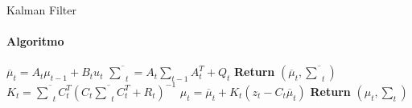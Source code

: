 \documentclass[aspectratio=169]{beamer}
\begin{document}
\begin{frame}[c]{Kalman Filter}
    
    \framesubtitle{Algoritmo}
    \begin{algorithm}[H]
        \caption{Kalman-Filter}
        \begin{algorithmic}[1]
            \State $\overline{\mu}_t = A_t\mu_{t-1} + B_t u_t$
            \State $ \overline{\textstyle\sum}_t = A_t {\textstyle\sum}_{t-1} A_t^T+ Q_t$ 
            \State \textbf{Return} $\left(\overline{\mu}_t, \overline{\textstyle\sum}_t\right)$
        \EndProcedure
            \State $K_t = \overline{\textstyle\sum}_tC_t^T(C_t\overline{\textstyle\sum}_tC_t^T+R_t)^{-1}$
            \State $\mu_t  = \overline{\mu}_t + K_t(z_t -C_t\overline\mu_t)$
            \State \textbf{Return} $\left(\mu_t, \textstyle\sum_t\right)$
        \EndProcedure
        \end{algorithmic}
    \end{algorithm}
\end{frame}
\end{document}
